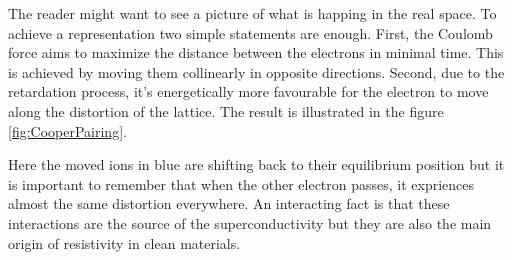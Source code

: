 \documentclass[../main.tex]{subfile}
\begin{document}
The reader might want to see a picture of what is happing in the real space. To achieve a representation two simple statements are enough. 
First, the Coulomb force aims to maximize the distance between the electrons in minimal time.
 This is achieved by moving them collinearly in opposite directions. Second, due to the retardation process, it's energetically more favourable
for the electron to move along the distortion of the lattice. The result is illustrated in the figure \ref{fig:CooperPairing}. 
\begin{figure}[H]
    \centering\label{fif:CooperPairing}
\end{figure}
Here the moved ions in blue are shifting back to their equilibrium position but it is important to remember that when the other 
electron passes, it expriences almost the same distortion everywhere.
An interacting fact is that these interactions are the source of the superconductivity but they are also the main origin of resistivity in clean materials.
\end{document}
